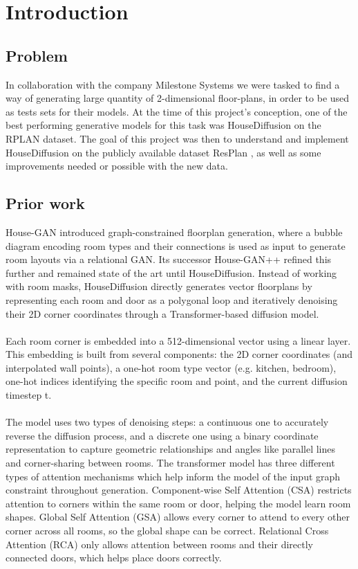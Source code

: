 \section{Introduction}
\label{sec:intro}

\subsection{Problem}
In collaboration with the company Milestone Systems we were tasked to find a way of  generating large quantity of 2-dimensional floor-plans, in order to be used as tests sets for their models. At the time of this project's conception, one of the best performing generative models for this task was HouseDiffusion \cite{HouseDiffusion} on the RPLAN dataset. The goal of this project was then to understand and implement HouseDiffusion on the publicly available dataset ResPlan \cite{ResPlan}, as well as some improvements needed or possible with the new data.

\subsection{Prior work}
House-GAN \cite{HouseGAN} introduced graph-constrained floorplan generation, where a bubble diagram encoding room types and their connections is used as input to generate room layouts via a relational GAN. Its successor House-GAN++ \cite{HouseGANpp} refined this further and remained state of the art until HouseDiffusion. Instead of working with room masks, HouseDiffusion directly generates vector floorplans by representing each room and door as a polygonal loop and iteratively denoising their 2D corner coordinates through a Transformer-based diffusion model. 
\\ \\
Each room corner is embedded into a 512-dimensional vector using a linear layer. This embedding is built from several components: the 2D corner coordinates (and interpolated wall points), a one-hot room type vector (e.g. kitchen, bedroom), one-hot indices identifying the specific room and point, and the current diffusion timestep t.
\\ \\
The model uses two types of denoising steps: a continuous one to accurately reverse the diffusion process, and a discrete one using a binary coordinate representation to capture geometric relationships and angles like parallel lines and corner-sharing between rooms. The transformer model has three different types of attention mechanisms which help inform the model of the input graph constraint throughout generation. Component-wise Self Attention (CSA) restricts attention to corners within the same room or door, helping the model learn room shapes. Global Self Attention (GSA) allows every corner to attend to every other corner across all rooms, so the global shape can be correct. Relational Cross Attention (RCA) only allows attention between rooms and their directly connected doors, which helps place doors correctly.



